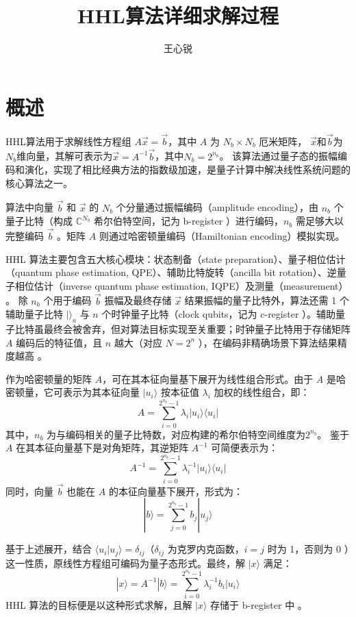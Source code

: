 \documentclass{article}
\title{HHL算法详细求解过程}
\author{王心锐}
\begin{document}
\maketitle

\section{概述}
HHL算法用于求解线性方程组 \( A\vec{x} = \vec{b} \)，其中 \( A \) 为 \( N_b \times N_b \) 厄米矩阵，
\(\vec{x}\)和\(\vec{b}\)为\( N_b \)维向量，其解可表示为\( \vec{x} = A^{-1}\vec{b} \)，其中\( N_b=2^{n_b} \)。
该算法通过量子态的振幅编码和演化，实现了相比经典方法的指数级加速，是量子计算中解决线性系统问题的核心算法之一。

算法中向量 \(\vec{b}\) 和 \(\vec{x}\) 的 \(N_b\) 个分量通过振幅编码（amplitude encoding），由 \(n_b\) 个量子比特（构成 \(\mathbb{C}^{N_b}\) 希尔伯特空间，记为 b-register ）进行编码，\(n_b\) 需足够大以完整编码 \(\vec{b}\) 。矩阵 \(A\) 则通过哈密顿量编码（Hamiltonian encoding）模拟实现。

HHL 算法主要包含五大核心模块：状态制备（state preparation）、量子相位估计（quantum phase estimation, QPE）、辅助比特旋转（ancilla bit rotation）、逆量子相位估计（inverse quantum phase estimation, IQPE）及测量（measurement） 。
除 \(n_b\) 个用于编码 \(\vec{b}\) 振幅及最终存储 \(\vec{x}\) 结果振幅的量子比特外，算法还需 1 个辅助量子比特 \(|\rangle_a\) 与 \(n\) 个时钟量子比特（clock qubits，记为 c-register ）。辅助量子比特虽最终会被舍弃，但对算法目标实现至关重要；时钟量子比特用于存储矩阵 \(A\) 编码后的特征值，且 \(n\) 越大（对应 \(N = 2^n\) ），在编码非精确场景下算法结果精度越高 。 

作为哈密顿量的矩阵 \(A\)，可在其本征向量基下展开为线性组合形式。由于 \(A\) 是哈密顿量，它可表示为其本征向量 \(|u_i\rangle\) 按本征值 \(\lambda_i\) 加权的线性组合，即：
\[A = \sum_{i=0}^{2^{n_b}-1} \lambda_i |u_i\rangle \langle u_i|\]
其中，\(n_b\) 为与编码相关的量子比特数，对应构建的希尔伯特空间维度为\(2^{n_b}\)。
鉴于 \(A\) 在其本征向量基下是对角矩阵，其逆矩阵 \(A^{-1}\) 可简便表示为：
\[A^{-1} = \sum_{i=0}^{2^{n_b}-1} \lambda_i^{-1} |u_i\rangle \langle u_i|\]
同时，向量 \(\vec{b}\) 也能在 \(A\) 的本征向量基下展开，形式为：
\[|b\rangle = \sum_{j=0}^{2^{n_b}-1} b_j |u_j\rangle\]

基于上述展开，结合 \(\langle u_i|u_j\rangle = \delta_{ij}\)（\(\delta_{ij}\) 为克罗内克函数，\(i = j\) 时为 1，否则为 0 ）这一性质，原线性方程组可编码为量子态形式。最终，解 \(|x\rangle\) 满足：
\[|x\rangle = A^{-1} |b\rangle = \sum_{i=0}^{2^{n_b}-1} \lambda_i^{-1} b_i |u_i\rangle\]
HHL 算法的目标便是以这种形式求解，且解 \(|x\rangle\) 存储于 b-register 中 。
\end{document}
